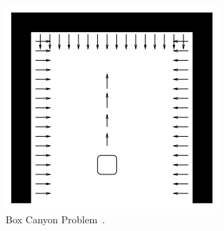 \begin{figure}[ht!]
  \centering
  \includegraphics[width=0.7\linewidth, height=0.7\linewidth]{img/pfprob}
  \caption{Box Canyon Problem~\cite{Goodrich2002PotentialFT}.}
  \label{fig:pfprob}
\end{figure}






